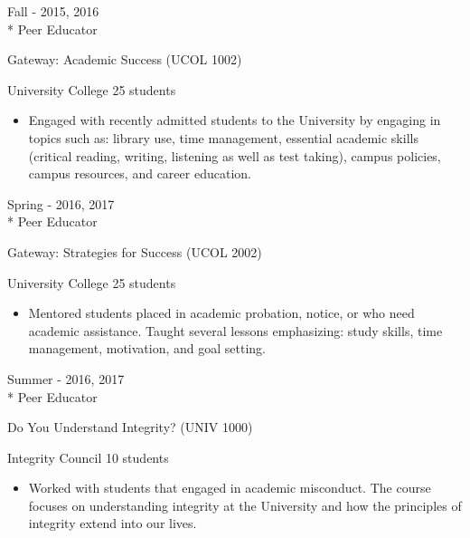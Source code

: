 \documentclass[a4paper,10pt]{article}
\newlength{\cvcolumngapwidth}
\newlength{\cvleftcolumnwidth}
\newlength{\cvrightcolumnwidth}
\newcommand{\cvtitlestyle}[1]{{\large\cvtitlefont\textcolor{cvtitlecolor}{#1}}}
\newcommand{\cvdurationstyle}[1]{{\small\cvdurationfont\textcolor{cvdurationcolor}{#1}}}
\newlength{\cvafteritemskipamount}
\newlength{\cvaftertitleskipamount}
\newlength{\cvparskip}
\newcommand{\cvitem}[2]{
    \begin{minipage}[t]{\cvleftcolumnwidth}
        \raggedleft #1
    \end{minipage}%
    \hspace{\cvcolumngapwidth}%
    \begin{minipage}[t]{\cvrightcolumnwidth}
        \setlength{\parskip}{\cvparskip} #2
    \end{minipage}

    \vspace{\cvafteritemskipamount}
}
\newcommand{\cvtitle}[1]{
    \cvtitlestyle{#1}

    \vspace{\cvaftertitleskipamount}
    \vspace{-\cvparskip}
}
\begin{document}
\cvitem{
\cvdurationstyle{Fall - 2015, 2016}
\\* Peer Educator


}{
    \cvtitle{Gateway: Academic Success (UCOL 1002)}

    University College \hfill{25 students}
    \vspace{0.15cm}
    
    \begin{itemize}[leftmargin=*]
    
        \item Engaged with recently admitted students to the University by engaging in topics such as: library use, time management, essential academic skills (critical reading, writing, listening as well as test taking), campus policies, campus resources, and career education.
        
    \end{itemize}
    
}\cvitem{
\cvdurationstyle{Spring - 2016, 2017}
\\* Peer Educator


}{
    \cvtitle{Gateway: Strategies for Success (UCOL 2002)}

    University College \hfill{25 students}
    \vspace{0.15cm}
    
    \begin{itemize}[leftmargin=*]
    
        \item Mentored students placed in academic probation, notice, or who need academic assistance. Taught several lessons emphasizing: study skills, time management, motivation, and goal setting.

    \end{itemize}
    
}\cvitem{
\cvdurationstyle{Summer - 2016, 2017}
\\* Peer Educator


}{
    \cvtitle{Do You Understand Integrity? (UNIV 1000)}

    Integrity Council \hfill{10 students}
    \vspace{0.15cm}
    
    \begin{itemize}[leftmargin=*]
    
        \item Worked with students that engaged in academic misconduct. The course focuses on understanding integrity at the University and how the principles of integrity extend into our lives.

        
    \end{itemize}
    
}
\vspace{-0.15cm}
\end{document}
